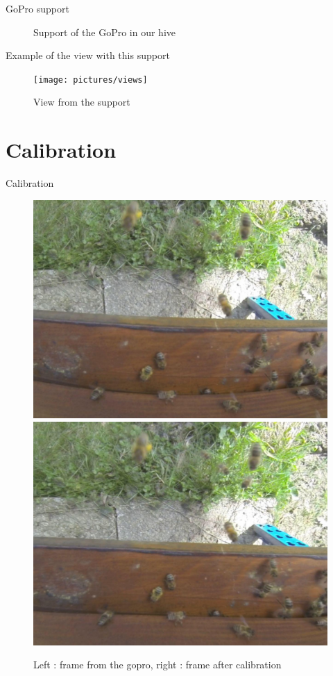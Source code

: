 \documentclass{beamer}
\begin{document}
\begin{frame}{GoPro support}
\begin{figure}
\caption{Support of the GoPro in our hive}
\end{figure}
\end{frame}


\begin{frame}{Example of the view with this support}

\begin{figure}
\texttt{[image: pictures/views]}
\caption{View from the support}
\end{figure}
\end{frame}

\section{Calibration}
\begin{frame}{Calibration}
\begin{figure}
\includegraphics[scale=0.33]{pictures/Dist}
\includegraphics[scale=0.33]{pictures/Calib}
\caption{Left : frame from the gopro, right : frame after calibration}
\end{figure}
\end{frame}
\end{document}
